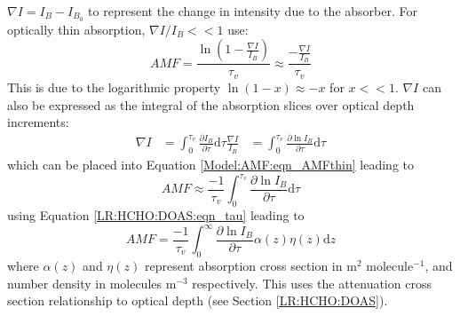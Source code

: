    $\nabla I = I_B - I_{B_0}$  to represent the change in intensity due to the absorber. 
  For optically thin absorption, $\nabla I / I_B << 1$ use:
  \begin{equation} \label{Model:AMF:eqn_AMFthin}
    AMF = \frac{\ln{ \left( 1 - \frac{\nabla I}{I_B} \right)} }{\tau_v} \approx \frac{ - \frac{\nabla I}{I_B} }{\tau_v}
  \end{equation}
  This is due to the logarithmic property $\ln \left(1-x \right) \approx -x$ for $x<<1$.
  $\nabla I$ can also be expressed as the integral of the absorption slices over optical depth increments: 
  \begin{eqnarray*}
    \nabla I &= \int_0^{\tau_v}{\frac{\partial I_B}{\partial \tau} \mathrm{d}\tau}
    \frac{\nabla I}{I_B} & = \int_0^{\tau_v}{\frac{\partial \ln{I_B}}{\partial \tau} \mathrm{d}\tau}
  \end{eqnarray*}
  which can be placed into Equation \ref{Model:AMF:eqn_AMFthin} leading to
  \begin{equation*}
    AMF \approx \frac{-1}{\tau_v} \int_0^{\tau_v}{\frac{\partial \ln{I_B}}{\partial \tau} \mathrm{d}\tau}
  \end{equation*}
   using Equation \ref{LR:HCHO:DOAS:eqn_tau} leading to
  \begin{equation} \label{Model:AMF:eqn_AMFcross}
    AMF = \frac{-1}{\tau_v} \int_0^\infty {\frac{\partial \ln{I_B}}{\partial \tau} \alpha(z)\eta(z)\mathrm{d}z}
  \end{equation}
  where $\alpha(z)$ and $\eta(z)$ represent absorption cross section in m$^2$ molecule$^{-1}$, and number density in molecules m$^{-3}$ respectively. 
  This uses the attenuation cross section relationship to optical depth (see Section \ref{LR:HCHO:DOAS}).
  
